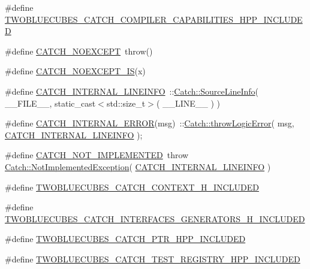 \begin{DoxyCompactItemize}
\item 
\#define \hyperlink{a00094_ae20e90c8b19224675d022f94b534ef6b}{T\+W\+O\+B\+L\+U\+E\+C\+U\+B\+E\+S\+\_\+\+C\+A\+T\+C\+H\+\_\+\+C\+O\+M\+P\+I\+L\+E\+R\+\_\+\+C\+A\+P\+A\+B\+I\+L\+I\+T\+I\+E\+S\+\_\+\+H\+P\+P\+\_\+\+I\+N\+C\+L\+U\+D\+E\+D}
\item 
\#define \hyperlink{a00094_a0408e94ca73880d41f38852b68eadb3c}{C\+A\+T\+C\+H\+\_\+\+N\+O\+E\+X\+C\+E\+P\+T}~throw()
\item 
\#define \hyperlink{a00094_a61ef049189c00120bf4d1641477e509c}{C\+A\+T\+C\+H\+\_\+\+N\+O\+E\+X\+C\+E\+P\+T\+\_\+\+I\+S}(x)
\item 
\#define \hyperlink{a00094_abc0b2405454c51748a31e0393d9ad5d1}{C\+A\+T\+C\+H\+\_\+\+I\+N\+T\+E\+R\+N\+A\+L\+\_\+\+L\+I\+N\+E\+I\+N\+F\+O}~\+::\hyperlink{a00075}{Catch\+::\+Source\+Line\+Info}( \+\_\+\+\_\+\+F\+I\+L\+E\+\_\+\+\_\+, static\+\_\+cast$<$std\+::size\+\_\+t$>$( \+\_\+\+\_\+\+L\+I\+N\+E\+\_\+\+\_\+ ) )
\item 
\#define \hyperlink{a00094_a05b6c8a530fa2e5b397add8966522777}{C\+A\+T\+C\+H\+\_\+\+I\+N\+T\+E\+R\+N\+A\+L\+\_\+\+E\+R\+R\+O\+R}(msg)~\+::\hyperlink{a00117_a702b612f683d154c466ea8297ed4a20d}{Catch\+::throw\+Logic\+Error}( msg, \hyperlink{a00094_abc0b2405454c51748a31e0393d9ad5d1}{C\+A\+T\+C\+H\+\_\+\+I\+N\+T\+E\+R\+N\+A\+L\+\_\+\+L\+I\+N\+E\+I\+N\+F\+O} );
\item 
\#define \hyperlink{a00094_ae717ef7d955c82073b1aae5a1d2de0ae}{C\+A\+T\+C\+H\+\_\+\+N\+O\+T\+\_\+\+I\+M\+P\+L\+E\+M\+E\+N\+T\+E\+D}~throw \hyperlink{a00055}{Catch\+::\+Not\+Implemented\+Exception}( \hyperlink{a00094_abc0b2405454c51748a31e0393d9ad5d1}{C\+A\+T\+C\+H\+\_\+\+I\+N\+T\+E\+R\+N\+A\+L\+\_\+\+L\+I\+N\+E\+I\+N\+F\+O} )
\item 
\#define \hyperlink{a00094_a07a1c68dee179942c1aede4f9b304543}{T\+W\+O\+B\+L\+U\+E\+C\+U\+B\+E\+S\+\_\+\+C\+A\+T\+C\+H\+\_\+\+C\+O\+N\+T\+E\+X\+T\+\_\+\+H\+\_\+\+I\+N\+C\+L\+U\+D\+E\+D}
\item 
\#define \hyperlink{a00094_a70327cb83c2141b3b54e9549418021ad}{T\+W\+O\+B\+L\+U\+E\+C\+U\+B\+E\+S\+\_\+\+C\+A\+T\+C\+H\+\_\+\+I\+N\+T\+E\+R\+F\+A\+C\+E\+S\+\_\+\+G\+E\+N\+E\+R\+A\+T\+O\+R\+S\+\_\+\+H\+\_\+\+I\+N\+C\+L\+U\+D\+E\+D}
\item 
\#define \hyperlink{a00094_af6024c3338ada36de16549522ec8f4dd}{T\+W\+O\+B\+L\+U\+E\+C\+U\+B\+E\+S\+\_\+\+C\+A\+T\+C\+H\+\_\+\+P\+T\+R\+\_\+\+H\+P\+P\+\_\+\+I\+N\+C\+L\+U\+D\+E\+D}
\item 
\#define \hyperlink{a00094_a202df3911846a6f2281d940b29b84824}{T\+W\+O\+B\+L\+U\+E\+C\+U\+B\+E\+S\+\_\+\+C\+A\+T\+C\+H\+\_\+\+T\+E\+S\+T\+\_\+\+R\+E\+G\+I\+S\+T\+R\+Y\+\_\+\+H\+P\+P\+\_\+\+I\+N\+C\+L\+U\+D\+E\+D}

\end{DoxyCompactItemize}
